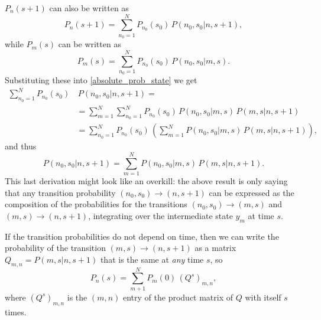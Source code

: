 \documentclass[12pt]{article}
\numberwithin{equation}{section} %
\begin{document}
$P_n(s+1)$ can also be written as
\begin{equation}
P_n(s+1) = \sum_{n_0 = 1}^N P_{n_0}(s_0)\,P\left(n_0, s_0|n, s+1\right),
\end{equation}
while $P_m(s)$ can be written as
\begin{equation}
P_m(s) = \sum_{n_0=1}^N P_{n_0}(s_0)\,P\left(n_0, s_0|m, s\right).
\end{equation}
Substituting these into \eqref{absolute_prob_state} we get
\begin{equation}
\begin{aligned}
\sum_{n_0 = 1}^N P_{n_0}(s_0)&\,P\left(n_0, s_0|n, s+1\right) =\\
&= \sum_{m=1}^N \sum_{n_0=1}^N P_{n_0}(s_0)\,P\left(n_0, s_0|m, s\right)\,P\left(m, s| n, s+1\right)\\
&= \sum_{n_0=1}^N P_{n_0}(s_0)\,\left( \sum_{m=1}^N P\left(n_0, s_0|m, s\right)\,P\left(m, s| n, s+1\right)\right),
\end{aligned}
\end{equation}
and thus
\begin{equation}
P\left(n_0, s_0|n, s+1\right) = \sum_{m=1}^N P\left(n_0, s_0|m, s\right)\,P\left(m, s| n, s+1\right).
\end{equation}
This last derivation might look like an overkill: the above result is only saying that any transition probability $(n_0, s_0)\to (n, s+1)$ can be expressed as the composition of the probabilities for the transitions $(n_0, s_0)\to (m, s)$ and $(m, s)\to (n, s+1)$, integrating over the intermediate state $y_m$ at time $s$.

If the transition probabilities do not depend on time, then we can write the probability of the transition $(m,s)\to (n,s+1)$ as a matrix $Q_{m,n} = P\left(m,s|n,s+1\right)$ that is the same at \textit{any} time $s$, so
\begin{equation}
P_n(s) = \sum_{m+1}^N P_m(0)\,\left(Q^s\right)_{m,n},
\end{equation}
where $\left(Q^s\right)_{m,n}$ is the $(m,n)$ entry of the product matrix of $Q$ with itself $s$ times.
\end{document}
